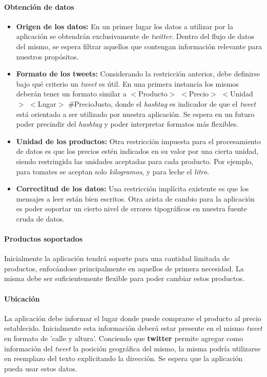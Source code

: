 \documentclass[10pt, a4paper]{article}
\begin{document}
\paragraph{Obtención de datos}
\begin{itemize}
    \item \textbf{Origen de los datos:} En un primer lugar los datos a utilizar por la aplicación se obtendrán exclusivamente de \emph{twitter}. Dentro del flujo de datos del mismo, se espera filtrar aquellos que contengan información relevante para nuestros propósitos.
    \item \textbf{Formato de los tweets:} Considerando la restricción anterior, debe definirse bajo qué criterio un \emph{tweet} es útil. En una primera instancia los mismos deberán tener un formato similar a \textsf{$<$Producto$>$ $<$Precio$>$ $<$Unidad$>$ $<$Lugar$>$ \#PrecioJusto}, donde el \emph{hashtag} es indicador de que el \emph{tweet} está orientado a ser utilizado por nuestra aplicación. Se espera en un futuro poder precindir del \emph{hashtag} y poder interpretar formatos más flexibles.
    \item \textbf{Unidad de los productos:} Otra restricción impuesta para el procesamiento de datos es que los precios estén indicados en su valor por una cierta unidad, siendo restringida las unidades aceptadas para cada producto. Por ejemplo, para tomates se aceptan solo \emph{kilogramos}, y para leche el \emph{litro}.
    \item \textbf{Correctitud de los datos:} Una restricción implícita existente es que los mensajes a leer están bien escritos. Otra arista de cambio para la aplicación es poder soportar un cierto nivel de errores tipográficos en nuestra fuente cruda de datos.
\end{itemize}

\paragraph{Productos soportados}
Inicialmente la aplicación tendrá soporte para una cantidad limitada de productos, enfocándose principalmente en aquellos de primera necesidad. La misma debe ser suficientemente flexible para poder cambiar estos productos. 

\paragraph{Ubicación}
La aplicación debe informar el lugar donde puede comprarse el producto al precio establecido. Inicialmente esta información deberá estar presente en el mismo \emph{tweet} en formato de 'calle y altura'. Conciendo que \textbf{twitter} permite agregar como información del \emph{tweet} la posición geográfica del mismo, la misma podría utilizarse en reemplazo del texto explicitando la dirección. Se espera que la aplicación pueda usar estos datos. 
\end{document}
